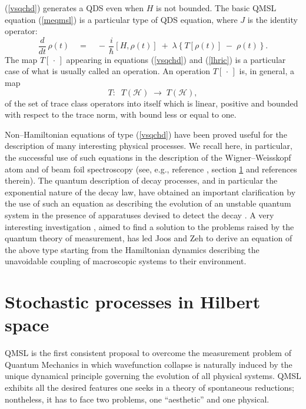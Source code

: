 \documentclass[10pt,a4paper]{article}
\begin{document}
(\ref{vsqchd}) generates a QDS even when $H$ is not bounded. The
basic QMSL equation (\ref{meqmsl}) is a particular type of QDS
equation, where $J$ is the identity operator:
\begin{equation} \label{vsqchp}
\frac{d}{dt}\, \rho(t) \quad = \quad -\, \frac{i}{\hbar} [H
,\rho(t)] \; + \; \lambda \left\{ T[\rho(t)] \; - \; \rho(t)
\right\}.
\end{equation}
The map $T[\,\cdot\,]$ appearing in equations (\ref{vsqchd}) and
(\ref{lhric}) is a particular case of what is usually called an
operation. An operation $T[\,\cdot\,]$ is, in general, a map
\[
T: \;\; T({\mathcal H}) \; \longrightarrow \; T({\mathcal H}),
\]
of the set of trace class operators into itself which is linear,
positive and bounded with respect to the trace norm, with bound
less or equal to one.

Non--Hamiltonian equations of type (\ref{vsqchd}) have been proved
useful for the description of many interesting physical processes.
We recall here, in particular, the successful use of such
equations in the description of the Wigner--Weisskopf atom and of
 beam foil spectroscopy (see, e.g., reference \cite{dav},
section \ref{sec6} and references therein). The quantum
description of decay processes, and in particular the exponential
nature of the decay law, have obtained an important clarification
by the use of such an equation as describing the evolution of an
unstable quantum system in the presence of apparatuses devised to
detect the decay \cite{fons1}. A very interesting investigation
\cite{jz}, aimed to find a solution to the problems raised by the
quantum theory of measurement, has led Joos and Zeh to derive an
equation of the above type starting from the Hamiltonian dynamics
describing the unavoidable coupling of macroscopic systems to
their environment.


\section{Stochastic processes in Hilbert space} \label{sec6}

QMSL is the first consistent proposal to overcome the measurement
problem of Quantum Mechanics in which wavefunction collapse is
naturally induced by the unique dynamical principle governing the
evolution of all physical systems. QMSL exhibits all the desired
features one seeks in a theory of spontaneous reductions;
nontheless, it has to face two problems, one ``aesthetic'' and one
physical.
\end{document}
